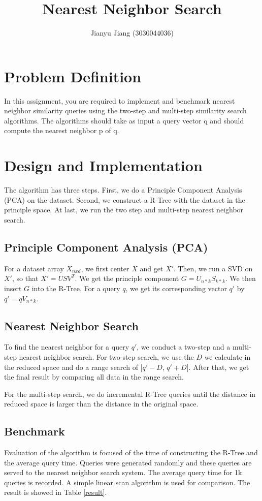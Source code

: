 \documentclass{article}
\title{Nearest Neighbor Search}
\author{Jianyu Jiang (3030044036)}
\begin{document}
\maketitle
\section{Problem Definition}
In this assignment, you are required to implement and benchmark nearest
neighbor similarity queries using
the two-step and multi-step similarity search
algorithms. The algorithms should take as input a query
vector q and should compute the nearest neighbor p of q.

\section{Design and Implementation}
The algorithm has three steps. First, we do a Principle Component Analysis (PCA)
on the dataset. Second, we construct a R-Tree with the dataset in the principle
space. At last, we run the two step and multi-step nearest neighbor search.

\subsection{Principle Component Analysis (PCA)}
For a dataset array $X_{nxd}$, we first center $X$ and get $X'$. Then,
we run a SVD on $X'$, so that $X' = USV^T$. We get the principle component
$G = U_{n*k}S_{k*k}$. We then insert $G$ into the R-Tree. For a query $q$,
we get its corresponding vector $q'$ by $q' = qV_{n*k}$.


\subsection{Nearest Neighbor Search}
To find the nearest neighbor for a query $q'$, we conduct a two-step and a multi-step
nearest neighbor search. For two-step search, we use the $D$ we calculate in
the reduced space and do a range search of [$q' - D$, $q' + D$]. After that, we
get the final result by comparing all data in the range search.

For the multi-step search, we do incremental R-Tree queries until the distance
in reduced space
is larger than the distance in the original space.

\subsection{Benchmark}
Evaluation of the algorithm is focused of the time of constructing the R-Tree
and the average query time.
Queries were generated randomly and
these queries are served to the nearest neighbor search system.
The average
query time for 1k queries is recorded. A simple linear scan algorithm is
used for comparison. The result is showed in Table \ref{result}.
\end{document}

